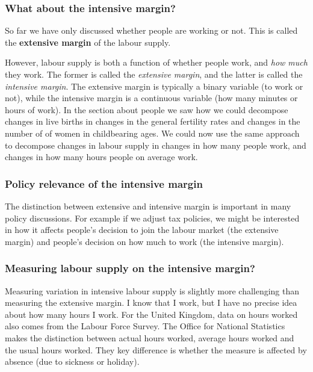 \documentclass[
]{book}
\begin{document}
\hypertarget{what-about-the-intensive-margin}{%
\subsubsection*{What about the intensive margin?}\label{what-about-the-intensive-margin}}

So far we have only discussed whether people are working or not. This is called the \textbf{extensive margin} of the labour supply.

However, labour supply is both a function of whether people work, and \emph{how much} they work. The former is called the \emph{extensive margin}, and the latter is called the \emph{intensive margin}. The extensive margin is typically a binary variable (to work or not), while the intensive margin is a continuous variable (how many minutes or hours of work). In the section about people we saw how we could decompose changes in live births in changes in the general fertility rates and changes in the number of of women in childbearing ages. We could now use the same approach to decompose changes in labour supply in changes in how many people work, and changes in how many hours people on average work.

\hypertarget{policy-relevance-of-the-intensive-margin}{%
\subsubsection*{Policy relevance of the intensive margin}\label{policy-relevance-of-the-intensive-margin}}

The distinction between extensive and intensive margin is important in many policy discussions. For example if we adjust tax policies, we might be interested in how it affects people's decision to join the labour market (the extensive margin) and people's decision on how much to work (the intensive margin).

\hypertarget{measuring-labour-supply-on-the-intensive-margin}{%
\subsubsection*{Measuring labour supply on the intensive margin?}\label{measuring-labour-supply-on-the-intensive-margin}}

Measuring variation in intensive labour supply is slightly more challenging than measuring the extensive margin. I know that I work, but I have no precise idea about how many hours I work. For the United Kingdom, data on hours worked also comes from the Labour Force Survey. The Office for National Statistics makes the distinction between actual hours worked, average hours worked and the usual hours worked. They key difference is whether the measure is affected by absence (due to sickness or holiday).
\end{document}
